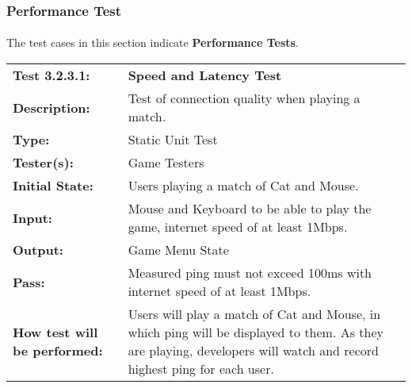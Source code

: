 \documentclass[12pt, titlepage]{article}
\begin{document}
\newpage
\subsubsection{Performance Test}
\paragraph{}The test cases in this section indicate \textbf{Performance Tests}.

\begin{mdframed}[linewidth=1pt]
\begin{tabularx}{\textwidth}{@{}p{3cm}X@{}}
{\bf Test 3.2.3.1:} & {\bf Speed and Latency Test}\\[\baselineskip]
{\bf Description:} & Test of connection quality when playing a match.\\[0.5\baselineskip]
{\bf Type:} & Static Unit Test\\[0.5\baselineskip]
{\bf Tester(s):} & Game Testers\\[0.5\baselineskip]
{\bf Initial State:} & Users playing a match of Cat and Mouse. \\[0.5\baselineskip]
{\bf Input:} & Mouse and Keyboard to be able to play the game, internet speed of at least 1Mbps.\\[0.5\baselineskip]
{\bf Output:} & Game Menu State\\[0.5\baselineskip]
{\bf Pass:} & Measured ping must not exceed 100ms with internet speed of at least 1Mbps.\\[0.5\baselineskip]
{\bf How test will be performed:} & Users will play a match of Cat and Mouse, in which ping will be displayed to them. As they are playing, developers will watch and record highest ping for each user. 
\end{tabularx}
\end{mdframed}
\end{document}
